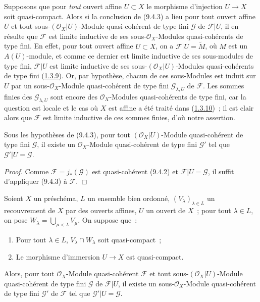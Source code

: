 \begin{remark}[9.4.4]
\label{I.9.4.4-fr}
Supposons que pour \emph{tout} ouvert affine $U\subset X$ le morphisme
d'injection $U\to X$ soit quasi-compact. Alors si la conclusion de (9.4.3) a
lieu pour tout ouvert affine $U$ et tout sous-$(\mathscr{O}_X|U)$-Module
quasi-cohérent de type fini $\mathscr{G}$ de $\mathscr{F}|U$,
il en résulte que $\mathscr{F}$ est limite inductive de ses
sous-$\mathscr{O}_X$-Modules quasi-cohérents de type fini. En effet, pour
tout ouvert affine $U\subset X$, on a $\mathscr{F}|U=\widetilde{M}$, où $M$
est un $A(U)$-module, et comme ce dernier est limite inductive de ses
sous-modules de type fini, $\mathscr{F}|U$ est limite inductive de ses
sous-$(\mathscr{O}_X|U)$-Modules quasi-cohérents de type fini
(\hyperref[I.1.3.9-fr]{1.3.9}). Or, par hypothèse, chacun de ces sous-Modules
est induit sur $U$ par un sous-$\mathscr{O}_X$-Module quasi-cohérent de type
fini $\mathscr{G}_{\lambda,U}$ de $\mathscr{F}$. Les sommes finies des
$\mathscr{G}_{\lambda,U}$ sont encore des $\mathscr{O}_X$-Modules
quasi-cohérents de type fini, car la question est locale et le cas où $X$
est affine a été traité dans (\hyperref[I.1.3.10-fr]{1.3.10})~; il est clair
alors que $\mathscr{F}$ est limite inductive de ces sommes finies, d'où notre
assertion.
\end{remark}

\begin{corollary}[9.4.5]
\label{I.9.4.5-fr}
Sous les hypothèses de (9.4.3), pour tout $(\mathscr{O}_X|U)$-Module
quasi-cohérent de type fini $\mathscr{G}$, il existe un
$\mathscr{O}_X$-Module quasi-cohérent de type fini $\mathscr{G}'$ tel que
$\mathscr{G}'|U=\mathscr{G}$.
\end{corollary}

\begin{proof}
Comme $\mathscr{F}=j_*(\mathscr{G})$ est quasi-cohérent (9.4.2) et
$\mathscr{F}|U=\mathscr{G}$, il suffit d'appliquer (9.4.3) à $\mathscr{F}$.
\end{proof}

\begin{lemma}[9.4.6]
\label{I.9.4.6-fr}
Soient $X$ un préschéma, $L$ un ensemble bien ordonné,
$(V_\lambda)_{\lambda\in L}$ un recouvrement de $X$ par des ouverts affines,
$U$ un ouvert de $X$~; pour tout $\lambda\in L$, on pose
$W_\lambda=\bigcup_{\mu<\lambda}V_\mu$. On suppose que~:
\begin{enumerate}
  \item[1\textsuperscript{o}] Pour tout $\lambda\in L$,
    $V_\lambda\cap W_\lambda$ soit quasi-compact~;
  \item[2\textsuperscript{o}] Le morphisme d'immersion $U\to X$ est
    quasi-compact.
\end{enumerate}
Alors, pour tout $\mathscr{O}_X$-Module quasi-cohérent $\mathscr{F}$ et tout
sous-$(\mathscr{O}_X|U)$-Module quasi-cohérent de type fini $\mathscr{G}$ de
$\mathscr{F}|U$, il existe un sous-$\mathscr{O}_X$-Module quasi-cohérent de
type fini $\mathscr{G}'$ de $\mathscr{F}$ tel que
$\mathscr{G}'|U=\mathscr{G}$.
\end{lemma}

